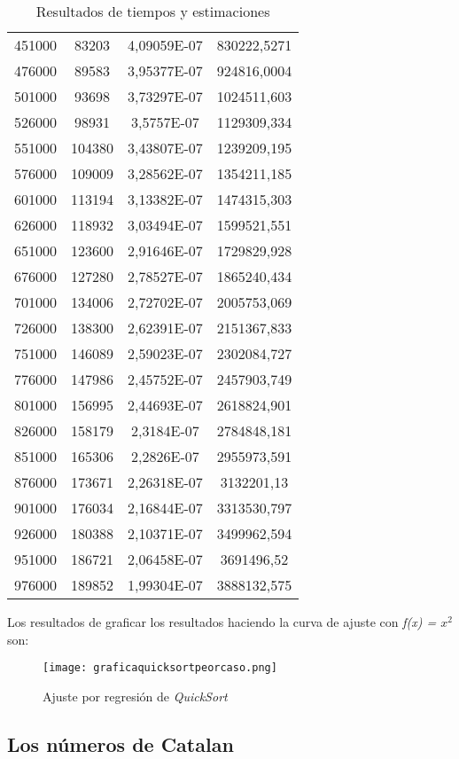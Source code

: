 \documentclass[a4paper,12pt]{article} %
\begin{document}
\begin{table}[H]
{\begin{tabular}{|c|c|c|c|}
	451000 & 83203  & 4,09059E-07 & 830222,5271  \\
	476000 & 89583  & 3,95377E-07 & 924816,0004  \\
	501000 & 93698  & 3,73297E-07 & 1024511,603  \\
	526000 & 98931  & 3,5757E-07  & 1129309,334  \\
	551000 & 104380 & 3,43807E-07 & 1239209,195  \\
	576000 & 109009 & 3,28562E-07 & 1354211,185  \\
	601000 & 113194 & 3,13382E-07 & 1474315,303  \\
	626000 & 118932 & 3,03494E-07 & 1599521,551  \\
	651000 & 123600 & 2,91646E-07 & 1729829,928  \\
	676000 & 127280 & 2,78527E-07 & 1865240,434  \\
	701000 & 134006 & 2,72702E-07 & 2005753,069  \\
	726000 & 138300 & 2,62391E-07 & 2151367,833  \\
	751000 & 146089 & 2,59023E-07 & 2302084,727  \\
	776000 & 147986 & 2,45752E-07 & 2457903,749  \\
	801000 & 156995 & 2,44693E-07 & 2618824,901  \\
	826000 & 158179 & 2,3184E-07  & 2784848,181  \\
	851000 & 165306 & 2,2826E-07  & 2955973,591  \\
	876000 & 173671 & 2,26318E-07 & 3132201,13   \\
	901000 & 176034 & 2,16844E-07 & 3313530,797  \\
	926000 & 180388 & 2,10371E-07 & 3499962,594  \\
	951000 & 186721 & 2,06458E-07 & 3691496,52   \\
	976000 & 189852 & 1,99304E-07 & 3888132,575  \\
	\hline
	\end{tabular}%
	}
	\caption{Resultados de tiempos y estimaciones}
	\label{tab:resultados}
	\end{table}

	Los resultados de graficar los resultados haciendo la curva de ajuste con \textit{f(x) = $x^{2}$} son:
	\begin{figure}[ht]
		\centering
		\texttt{[image: graficaquicksortpeorcaso.png]}
		\caption{Ajuste por regresión de \textit{QuickSort}}
	  \end{figure}
	  
\subsection{Los números de Catalan}
\end{document}
